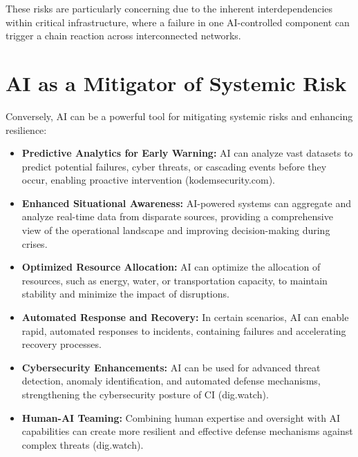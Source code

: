These risks are particularly concerning due to the inherent interdependencies within critical infrastructure, where a failure in one AI-controlled component can trigger a chain reaction across interconnected networks.

\section{AI as a Mitigator of Systemic Risk}
Conversely, AI can be a powerful tool for mitigating systemic risks and enhancing resilience:
\begin{itemize}
    \item \textbf{Predictive Analytics for Early Warning:} AI can analyze vast datasets to predict potential failures, cyber threats, or cascading events before they occur, enabling proactive intervention (kodemsecurity.com).
    \item \textbf{Enhanced Situational Awareness:} AI-powered systems can aggregate and analyze real-time data from disparate sources, providing a comprehensive view of the operational landscape and improving decision-making during crises.
    \item \textbf{Optimized Resource Allocation:} AI can optimize the allocation of resources, such as energy, water, or transportation capacity, to maintain stability and minimize the impact of disruptions.
    \item \textbf{Automated Response and Recovery:} In certain scenarios, AI can enable rapid, automated responses to incidents, containing failures and accelerating recovery processes.
    \item \textbf{Cybersecurity Enhancements:} AI can be used for advanced threat detection, anomaly identification, and automated defense mechanisms, strengthening the cybersecurity posture of CI (dig.watch).
    \item \textbf{Human-AI Teaming:} Combining human expertise and oversight with AI capabilities can create more resilient and effective defense mechanisms against complex threats (dig.watch).
\end{itemize}

